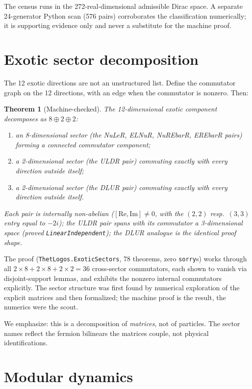 \documentclass[aps,prd,twocolumn,superscriptaddress,showpacs]{revtex4-2}
\newtheorem{theorem}{Theorem}
\begin{document}
The census runs in the 272-real-dimensional admissible Dirac
space. A separate 24-generator Python scan (576 pairs) corroborates
the classification numerically; it is supporting evidence only
and never a substitute for the machine proof.

\section{Exotic sector decomposition}

The 12 exotic directions are not an unstructured list. Define
the commutator graph on the 12 directions, with an edge when the
commutator is nonzero. Then:

\begin{theorem}[Machine-checked]
The 12-dimensional exotic component decomposes as
$8 \oplus 2 \oplus 2$:
\begin{enumerate}
\item an 8-dimensional sector (the NuLeR, ELNuR, NuREbarR,
EREbarR pairs) forming a connected commutator component;
\item a 2-dimensional sector (the ULDR pair) commuting exactly
with every direction outside itself;
\item a 2-dimensional sector (the DLUR pair) commuting exactly
with every direction outside itself.
\end{enumerate}
Each pair is internally non-abelian
($[\mathrm{Re}, \mathrm{Im}] \neq 0$, with the $(2,2)$ resp.\
$(3,3)$ entry equal to $-2i$); the ULDR pair spans with its
commutator a 3-dimensional space (proved
\texttt{LinearIndependent}); the DLUR analogue is the identical
proof shape.
\end{theorem}

The proof (\texttt{ThetLogos.ExoticSectors}, 78 theorems, zero
\texttt{sorry}s) works through all $2 \times 8 + 2 \times 8 +
2 \times 2 = 36$ cross-sector commutators, each shown to vanish
via disjoint-support lemmas, and exhibits the nonzero internal
commutators explicitly. The sector structure was first found by
numerical exploration of the explicit matrices and then
formalized; the machine proof is the result, the numerics were
the scout.

We emphasize: this is a decomposition of \emph{matrices}, not
of particles. The sector names reflect the fermion bilinears
the matrices couple, not physical identifications.

\section{Modular dynamics}
\end{document}

